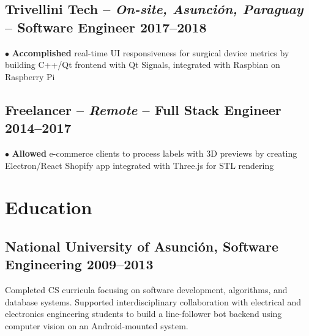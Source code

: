\documentclass[10pt,a4paper]{article}
\newcommand{\actionverb}[1]{\textcolor{actioncolor}{\textbf{#1}}}
\newcommand{\cvsinglecompany}[5]{
  \subsection{#1 \textcolor{mediumgray}{#2} -- \textbf{\small #3} \hfill {\footnotesize\textcolor{mediumgray}{#4}}}
  {\footnotesize #5}
  \vspace{0.2em}
}
\newcommand{\cveducation}[4]{
  \subsection{#1, \textbf{\small #2} \hfill {\footnotesize\textcolor{mediumgray}{#3}}}
  {\footnotesize #4}
}
\begin{document}
\cvsinglecompany{Trivellini Tech}{-- \textit{On-site, Asunción, Paraguay}}{Software Engineer}{2017--2018}{
$\bullet$ \actionverb{Accomplished} real-time UI responsiveness for surgical device metrics by building C++/Qt frontend with Qt Signals, integrated with Raspbian on Raspberry Pi
}

\cvsinglecompany{Freelancer}{-- \textit{Remote}}{Full Stack Engineer}{2014--2017}{
$\bullet$ \actionverb{Allowed} e-commerce clients to process labels with 3D previews by creating Electron/React Shopify app integrated with Three.js for STL rendering
}




\section{Education}
\cveducation{National University of Asunción}{Software Engineering}{2009--2013}{Completed CS curricula focusing on software development, algorithms, and database systems. Supported interdisciplinary collaboration with electrical and electronics engineering students to build a line-follower bot backend using computer vision on an Android-mounted system.}
\end{document}
